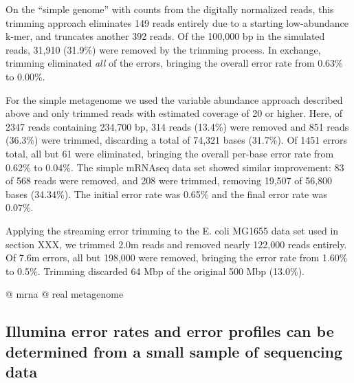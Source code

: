 \documentclass{article}
\begin{document}

On the ``simple genome'' with counts from the digitally normalized
reads, this trimming approach eliminates 149 reads entirely due to a
starting low-abundance k-mer, and truncates another 392 reads.  Of the
100,000 bp in the simulated reads, 31,910 (31.9\%) were removed by the
trimming process.  In exchange, trimming eliminated {\em all} of the
errors, bringing the overall error rate from 0.63\% to 0.00\%.


For the simple metagenome we used the variable abundance approach
described above and only trimmed reads with estimated coverage of 20
or higher.  Here, of 2347 reads containing 234,700 bp, 314 reads
(13.4\%) were removed and 851 reads (36.3\%) were trimmed, discarding
a total of 74,321 bases (31.7\%).  Of 1451 errors total, all but 61
were eliminated, bringing the overall per-base error rate from 0.62\% to
0.04\%.  The simple mRNAseq data set showed similar improvement: 83 of
568 reads were removed, and 208 were trimmed, removing 19,507 of
56,800 bases (34.34\%).  The initial error rate was 0.65\% and the
final error rate was 0.07\%.




Applying the streaming error trimming to the E. coli MG1655 data set
used in section XXX, we trimmed 2.0m reads and removed nearly 122,000
reads entirely.  Of 7.6m errors, all but 198,000 were removed,
bringing the error rate from 1.60\% to 0.5\%.  Trimming discarded 64
Mbp of the original 500 Mbp (13.0\%).

@ mrna
@ real metagenome

\subsection{Illumina error rates and error profiles can be determined from a
small sample of sequencing data}
\end{document}

